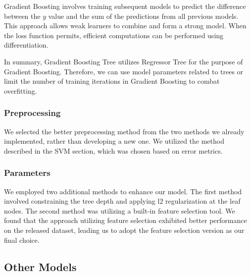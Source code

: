 \documentclass[10pt,letterpaper]{article}
\begin{document}
Gradient Boosting involves training subsequent models to predict the difference between the $y$ value and the sum of the predictions from all previous models. This approach allows weak learners to combine and form a strong model. When the loss function permits, efficient computations can be performed using differentiation.

In summary, Gradient Boosting Tree utilizes Regressor Tree for the purpose of Gradient Boosting. Therefore, we can use model parameters related to trees or limit the number of training iterations in Gradient Boosting to combat overfitting.

\subsubsection{Preprocessing}

We selected the better preprocessing method from the two methods we already implemented, rather than developing a new one. We utilized the method described in the SVM section, which was chosen based on error metrics.

\subsubsection{Parameters}

We employed two additional methods to enhance our model. The first method involved constraining the tree depth and applying l2 regularization at the leaf nodes. The second method was utilizing a built-in feature selection tool. We found that the approach utilizing feature selection exhibited better performance on the released dataset, leading us to adopt the feature selection version as our final choice.


\subsection{Other Models}
\end{document}
